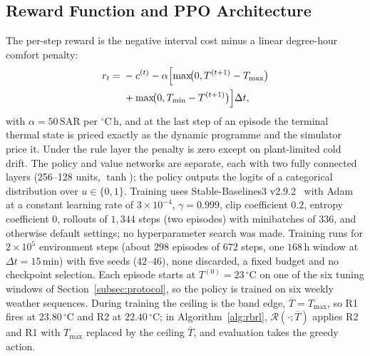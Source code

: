 \documentclass[3p,twocolumn,number]{elsarticle}
\newcommand{\Tmin}{T_{\min}}
\newcommand{\Tmax}{T_{\max}}
\newcommand{\SAR}{\text{SAR}}
\begin{document}
\subsection{Reward Function and PPO Architecture}
\label{subsec:reward}
 
The per-step reward is the negative interval cost minus a linear degree-hour comfort penalty:
\begin{equation}
\begin{split}
  r_t={}&-c^{(t)}-\alpha\Bigl[\max\!\bigl(0,T^{(t+1)}-\Tmax\bigr)\\
       &+\max\!\bigl(0,\Tmin-T^{(t+1)}\bigr)\Bigr]\Delta t,
\end{split}
  \label{eq:reward}
\end{equation}
with $\alpha=50\,\SAR$ per $^\circ$C\,h, and at the last step of an episode the terminal thermal state is priced exactly as the dynamic programme and the simulator price it. Under the rule layer the penalty is zero except on plant-limited cold drift. The policy and value networks are separate, each with two fully connected layers (256--128 units, $\tanh$); the policy outputs the logits of a categorical distribution over $u\in\{0,1\}$. Training uses Stable-Baselines3 v2.9.2~\cite{Raffin2021} with Adam at a constant learning rate of $3\times10^{-4}$, $\gamma=0.999$, clip coefficient $0.2$, entropy coefficient $0$, rollouts of $1{,}344$ steps (two episodes) with minibatches of $336$, and otherwise default settings; no hyperparameter search was made. Training runs for $2\times10^{5}$ environment steps (about $298$ episodes of $672$ steps, one $168\,$h window at $\Delta t=15\,$min) with five seeds ($42$--$46$), none discarded, a fixed budget and no checkpoint selection. Each episode starts at $T^{(0)}=23\,^\circ$C on one of the six tuning windows of Section~\ref{subsec:protocol}, so the policy is trained on six weekly weather sequences. During training the ceiling is the band edge, $\overline{T}=\Tmax$, so R1 fires at $23.80\,^\circ$C and R2 at $22.40\,^\circ$C; in Algorithm~\ref{alg:rbrl}, $\mathcal{R}(\cdot;\overline{T})$ applies R2 and R1 with $\Tmax$ replaced by the ceiling $\overline{T}$, and evaluation takes the greedy action.
\end{document}
